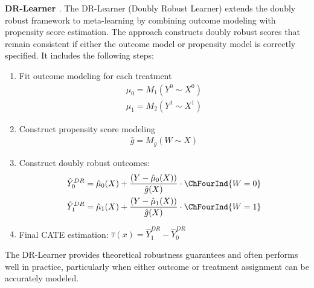 \textbf{DR-Learner \citep{kennedy2023towards}}. The DR-Learner (Doubly Robust Learner) extends the doubly robust framework to meta-learning by combining outcome modeling with propensity score estimation. The approach constructs doubly robust scores that remain consistent if either the outcome model or propensity model is correctly specified. It includes the following steps:
\begin{enumerate}
    \item Fit outcome modeling for each treatment
        \begin{align*}
            \hat{\mu}_0 = M_1(Y^0 \sim X^0)\\
            \hat{\mu}_1 = M_2(Y^1 \sim X^1)
        \end{align*}
    \item Construct propensity score modeling
        \begin{align*}
            \hat{g} = M_g(W \sim X)
        \end{align*}
    \item Construct doubly robust outcomes:
        \begin{align*}
            \hat{Y}_{0}^{DR} = \hat{\mu}_0(X) + \frac{(Y - \hat{\mu}_0(X))}{\hat{g}(X)}  \cdot \ChFourInd\{W = 0\} \\
            \hat{Y}_{1}^{DR} = \hat{\mu}_1(X) + \frac{(Y - \hat{\mu}_1(X))}{\hat{g}(X)}  \cdot \ChFourInd\{W = 1\}
        \end{align*}
    \item Final CATE estimation: $\hat{\tau}(x) = \hat{Y}_{1}^{DR} - \hat{Y}_{0}^{DR}$
\end{enumerate}
The DR-Learner provides theoretical robustness guarantees and often performs well in practice, particularly when either outcome or treatment assignment can be accurately modeled.

